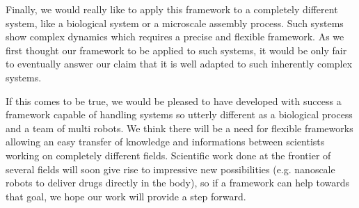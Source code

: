 	Finally, we would really like to apply this framework to a completely different system, like a biological system or a microscale assembly process. Such systems show complex dynamics which requires a precise and flexible framework. As we first thought our framework to be applied to such systems, it would be only fair to eventually answer our claim that it is well adapted to such inherently complex systems.
	
	If this comes to be true, we would be pleased to have developed with success a framework capable of handling systems so utterly different as a biological process and a team of multi robots. We think there will be a need for flexible frameworks allowing an easy transfer of knowledge and informations between scientists working on completely different fields. Scientific work done at the frontier of several fields will soon give rise to impressive new possibilities (e.g. nanoscale robots to deliver drugs directly in the body), so if a framework can help towards that goal, we hope our work will provide a step forward.
	
